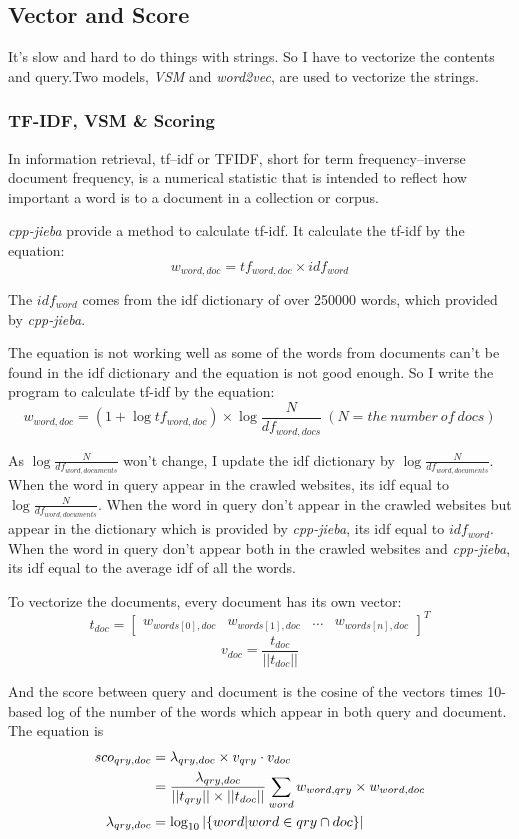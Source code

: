 \documentclass[a4paper]{article}
\begin{document}
\subsection{Vector and Score}

It's slow and hard to do things with strings. So I have to vectorize the contents and query.Two models, \emph{VSM}  and \emph{word2vec}, are used to vectorize the strings.

\subsubsection{TF-IDF, VSM \& Scoring}

In information retrieval, tf–idf or TFIDF, short for term frequency–inverse document frequency, is a numerical statistic that is intended to reflect how important a word is to a document in a collection or corpus.

\emph{cpp-jieba} provide a method to calculate tf-idf. It calculate the tf-idf by the equation:$$w_{word,doc}=tf_{word,doc}\times idf_{word}$$

The $idf_{word}$ comes from the idf dictionary of over 250000 words, which provided by \emph{cpp-jieba}.

The equation is not working well as some of the words from documents can't be found in the idf dictionary and the equation is not good enough. So I write the program to calculate tf-idf by the equation:$$w_{word,doc}=(1+\log{tf_{word,doc}})\times \log{\frac{N}{df_{word,docs}}}\ (N=the\ number\ of\ docs)$$

As $\log{\frac{N}{df_{word,documents}}}$ won't change, I update the idf dictionary by $\log{\frac{N}{df_{word,documents}}}$. When the word in query appear in the crawled websites, its idf equal to $\log{\frac{N}{df_{word,documents}}}$. When the word in query don't appear in the crawled websites but appear in the dictionary which is provided by \emph{cpp-jieba}, its idf equal to $idf_{word}$. When the word in query don't appear both in the crawled websites and \emph{cpp-jieba}, its idf equal to the average idf of all the words. 

To vectorize the documents, every document has its own vector:$$t_{doc}=\left[\begin{matrix}w_{words[0],doc}&w_{words[1],doc}&\ldots&w_{words[n],doc}\end{matrix}\right]^{T}$$$$v_{doc}=\frac{t_{doc}}{||t_{doc}||}$$

And the score between query and document is the cosine of the vectors times 10-based log of the number of the words which appear in both query and document. The equation is
\begin{equation}
\begin{aligned}
sco_{qry,doc} & = \lambda_{qry, doc} \times v_{qry}\cdot v_{doc} \\
& =\frac{\lambda_{qry, doc} }{||t_{qry}||\times||t_{doc}||}\sum_{word}w_{word,qry}\times w_{word,doc} \\
\lambda_{qry, doc} &= \log_{10}{|\{word|word \in qry \cap doc\}|} \notag
\end{aligned}
\end{equation}
\end{document}
